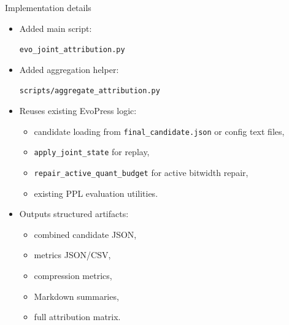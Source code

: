 \documentclass[aspectratio=169]{beamer}
\begin{document}
\begin{frame}{Implementation details}
\small
\begin{itemize}
    \item Added main script:
    \begin{center}
        \texttt{evo\_joint\_attribution.py}
    \end{center}
    \item Added aggregation helper:
    \begin{center}
        \texttt{scripts/aggregate\_attribution.py}
    \end{center}
    \item Reuses existing EvoPress logic:
    \begin{itemize}
        \item candidate loading from \texttt{final\_candidate.json} or config text files,
        \item \texttt{apply\_joint\_state} for replay,
        \item \texttt{repair\_active\_quant\_budget} for active bitwidth repair,
        \item existing PPL evaluation utilities.
    \end{itemize}
    \item Outputs structured artifacts:
    \begin{itemize}
        \item combined candidate JSON,
        \item metrics JSON/CSV,
        \item compression metrics,
        \item Markdown summaries,
        \item full attribution matrix.
    \end{itemize}
\end{itemize}
\end{frame}

\end{document}
